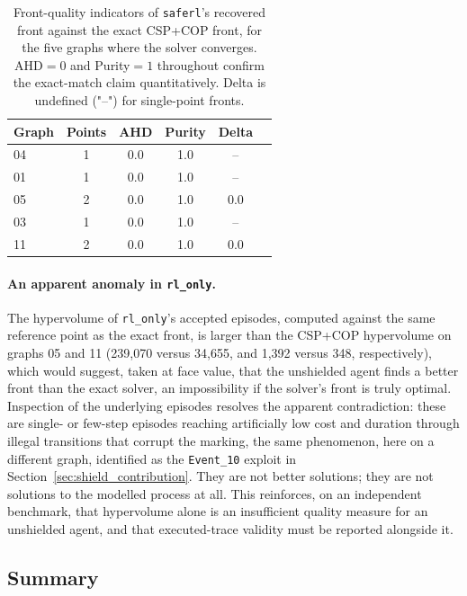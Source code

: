 \begin{table}[H]
\centering
\caption{Front-quality indicators of \texttt{saferl}'s recovered front
against the exact CSP+COP front, for the five graphs where the solver
converges. AHD$=0$ and Purity$=1$ throughout confirm the exact-match
claim quantitatively. Delta is undefined ("--") for single-point
fronts.}
\label{tab:external_front_quality}
\begin{tabular}{lccccc}
\toprule
\textbf{Graph} & \textbf{Points} & \textbf{AHD} & \textbf{Purity} & \textbf{Delta} \\
\midrule
04 & 1 & 0.0 & 1.0 & -- \\
01 & 1 & 0.0 & 1.0 & -- \\
05 & 2 & 0.0 & 1.0 & 0.0 \\
03 & 1 & 0.0 & 1.0 & -- \\
11 & 2 & 0.0 & 1.0 & 0.0 \\
\bottomrule
\end{tabular}
\end{table}

\paragraph{An apparent anomaly in \texttt{rl\_only}.}
The hypervolume of \texttt{rl\_only}'s accepted episodes, computed
against the same reference point as the exact front, is larger than
the CSP+COP hypervolume on graphs 05 and 11 (239{,}070 versus 34{,}655,
and 1{,}392 versus 348, respectively), which would suggest, taken at
face value, that the unshielded agent finds a better front than the
exact solver, an impossibility if the solver's front is truly optimal.
Inspection of the underlying episodes resolves the apparent
contradiction: these are single- or few-step episodes reaching
artificially low cost and duration through illegal transitions that
corrupt the marking, the same phenomenon, here on a different graph,
identified as the \texttt{Event\_10} exploit in
Section~\ref{sec:shield_contribution}. They are not better solutions;
they are not solutions to the modelled process at all. This
reinforces, on an independent benchmark, that hypervolume alone is an
insufficient quality measure for an unshielded agent, and that
executed-trace validity must be reported alongside it.

\subsection{Summary}
\label{sec:external_summary}

